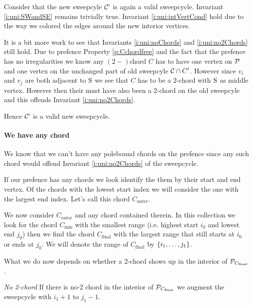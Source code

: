       Consider that the new sweepcyle $\C'$ is again a valid sweepcycle. Invariant \ref{i:uni:SWandSE} remains trivially true. Invariant \ref{i:uni:intVertCond} hold due to the way we colored the edges around the new interior vertices.

      It is a bit more work to see that Invariants \ref{i:uni:noChords} and \ref{i:uni:no2Chords} still hold. Due to prefence Property \ref{p:Cchordfree} and the fact that the prefence has no irregularities we know any $(2-)$chord $C$ has to have one vertex on $\P$ and one vertex on the unchanged part of old sweepcyle $\C \cap C'$.
      However since $v_i$ and $v_j$ are both adjacent to $\pS$ we see that $C$ has to be a $2$-chord with $\pS$ as middle vertex. However then their must have also been a $2$-chord on the old sweepcyle and this offends Invariant \ref{i:uni:no2Chords}.

      Hence $\C'$ is a valid new sweepcycle.

    \paragraph{We have any chord}
    We know that we can't have any polebound chords on the prefence since any such chord would offend Invariant \ref{i:uni:no2Chords} of the sweepcycle.

    If our prefence has any chords we look identify the them by their start and end vertex. Of the chords with the lowest start index we will consider the one with the largest end index. Let's call this chord $C_\text{outer}$.

    We now consider $C_\text{outer}$ and any chord contained therein. In this collection we look for the chord $C_\text{min}$ with the smallest range (i.e. highest start $i_0$ and lowest end $j_0$) then we find the chord $C_\text{final}$ with the largest range that still starts at $i_0$ or ends at $j_0$. We will denote the range of $C_\text{final}$ by $\braces{i_1, \ldots, j_1}$.

    What we do now depends on whether a 2-chord shows up in the interior of $\P_{C_\text{final}}$.


    \emph{No 2-chord}
    If there is no-2 chord in the interior of $\P_{C_\text{final}}$ we augment the sweepcycle with $i_1 +1$ to $j_1 -1$.

